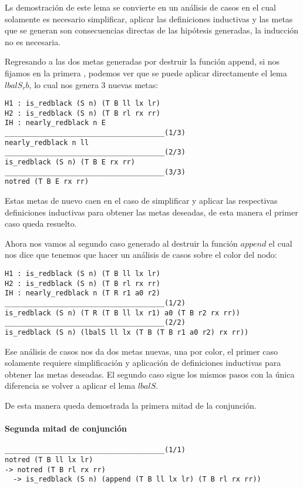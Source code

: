 Ls demostraci\'on de este lema se convierte en un análisis de casos en el cual solamente es
necesario simplificar, aplicar las definiciones inductivas y las metas que se generan son
consecuencias directas de las hipótesis generadas, la inducci\'on no es necesaria.

Regresando a las dos metas generadas por destruir la funci\'on append, si nos fijamos en la primera
, podemos ver que se puede aplicar directamente el lema $lbalS_rb$, lo cual nos genera 3 nuevas metas:

\begin{verbatim}
H1 : is_redblack (S n) (T B ll lx lr)
H2 : is_redblack (S n) (T B rl rx rr)
IH : nearly_redblack n E
______________________________________(1/3)
nearly_redblack n ll
______________________________________(2/3)
is_redblack (S n) (T B E rx rr)
______________________________________(3/3)
notred (T B E rx rr)
\end{verbatim}

Estas metas de nuevo caen en el caso de simplificar y aplicar las respectivas definiciones
inductivas para obtener las metas deseadas, de esta manera el primer caso queda resuelto.

Ahora nos vamos al segundo caso generado al destruir la funci\'on $append$ el cual nos dice que
tenemos que hacer un análisis de casos sobre el color del nodo:

\begin{verbatim}
H1 : is_redblack (S n) (T B ll lx lr)
H2 : is_redblack (S n) (T B rl rx rr)
IH : nearly_redblack n (T R r1 a0 r2)
______________________________________(1/2)
is_redblack (S n) (T R (T B ll lx r1) a0 (T B r2 rx rr))
______________________________________(2/2)
is_redblack (S n) (lbalS ll lx (T B (T B r1 a0 r2) rx rr))
\end{verbatim}

Ese análisis de casos nos da dos metas nuevas, una por color, el primer caso solamente requiere
simplificaci\'on y aplicaci\'on de definiciones inductivas para obtener las metas deseadas. El
segundo caso sigue los mismos pasos con la única diferencia se volver a aplicar el lema $lbalS$.

De esta manera queda demostrada la primera mitad de la conjunci\'on.

\paragraph{Segunda mitad de conjunci\'on}

\begin{verbatim}
______________________________________(1/1)
notred (T B ll lx lr)
-> notred (T B rl rx rr)
  -> is_redblack (S n) (append (T B ll lx lr) (T B rl rx rr))
\end{verbatim}

